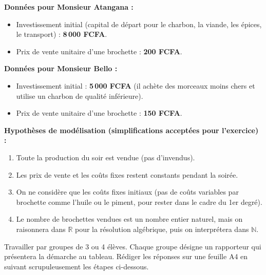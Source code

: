 \documentclass[11pt]{article}
\newcounter{popsec}
\newcounter{popsub}
\newcommand{\courssub}[1]{%
  \stepcounter{popsub}%
  \par\vspace{9pt}\noindent{\popxbold\fontsize{11.5}{13}\selectfont\color{popink}{\color{poporange}\thepopsec.\thepopsub}\hspace{6pt}#1}\par\nopagebreak\vspace{4pt}
}
\begin{document}
\textbf{Données pour Monsieur Atangana :}
\begin{itemize}
    \item Investissement initial (capital de départ pour le charbon, la viande, les épices, le transport) : \textbf{8\,000 FCFA}.
    \item Prix de vente unitaire d'une brochette : \textbf{200 FCFA}.
\end{itemize}

\textbf{Données pour Monsieur Bello :}
\begin{itemize}
    \item Investissement initial : \textbf{5\,000 FCFA} (il achète des morceaux moins chers et utilise un charbon de qualité inférieure).
    \item Prix de vente unitaire d'une brochette : \textbf{150 FCFA}.
\end{itemize}

\textbf{Hypothèses de modélisation (simplifications acceptées pour l'exercice) :}
\begin{enumerate}
    \item Toute la production du soir est vendue (pas d'invendus).
    \item Les prix de vente et les coûts fixes restent constants pendant la soirée.
    \item On ne considère que les coûts fixes initiaux (pas de coûts variables par brochette comme l'huile ou le piment, pour rester dans le cadre du 1er degré).
    \item Le nombre de brochettes vendues est un nombre entier naturel, mais on raisonnera dans $\mathbb{R}$ pour la résolution algébrique, puis on interprétera dans $\mathbb{N}$.
\end{enumerate}

\courssub{Consignes}
Travailler par groupes de 3 ou 4 élèves. Chaque groupe désigne un rapporteur qui présentera la démarche au tableau. Rédiger les réponses sur une feuille A4 en suivant scrupuleusement les étapes ci-dessous.
\end{document}
